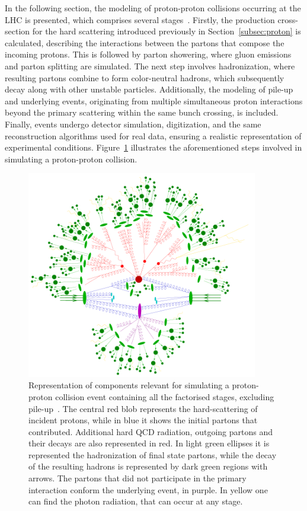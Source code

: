 In the following section, the modeling of proton-proton collisions occurring at the LHC is presented, which comprises several stages~\cite{BUCKLEY2011145}.
Firstly, the production cross-section for the hard scattering introduced previously in Section~\ref{subsec:proton} is calculated, describing the interactions between the partons that compose the incoming protons.
This is followed by parton showering, where gluon emissions and parton splitting are simulated. The next step involves hadronization, where resulting partons combine to form color-neutral hadrons, which subsequently decay along with other unstable particles. Additionally, the modeling of pile-up and underlying events, originating from multiple simultaneous proton interactions beyond the primary scattering within the same bunch crossing, is included.
Finally, events undergo detector simulation, digitization, and the same reconstruction algorithms used for real data, ensuring a realistic representation of experimental conditions.
Figure~\ref{fig:pdfs} illustrates the aforementioned steps involved in simulating a proton-proton collision.
\begin{figure}[htbp]
    \centering
    \includegraphics[width=0.9\textwidth]{images/atlas_pp_sim.png}
    \caption{Representation of components relevant for simulating a proton-proton collision event containing all the factorised stages, excluding pile-up~\cite{Gleisberg_2009}. The central red blob represents the hard-scattering of incident protons,
    while in blue it shows the initial partons that contributed. Additional hard QCD radiation, outgoing partons and their decays are also represented in red. In light green ellipses it is represented the hadronization of final state partons, while the decay
    of the resulting hadrons is represented by dark green regions with arrows. The partons that did not participate in the primary interaction conform the underlying event, in purple. In yellow one can find the photon radiation, that can occur at any stage.}
    \label{fig:pdfs}
  \end{figure}

